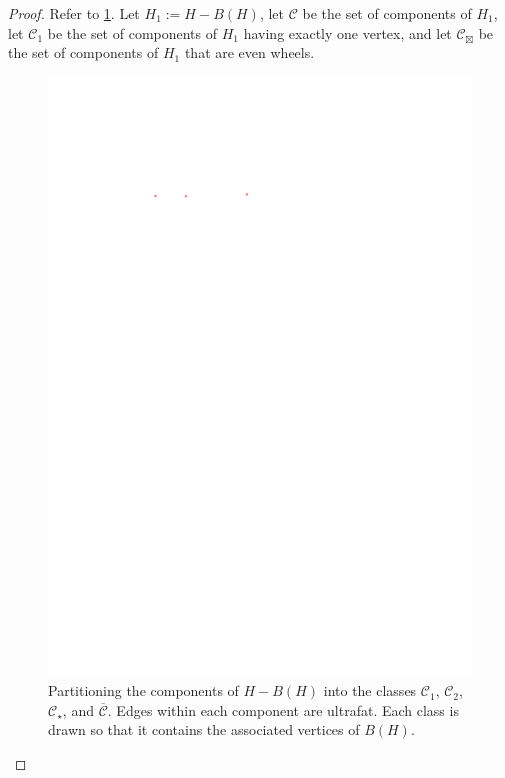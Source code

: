 \documentclass[12pt]{article}
\theoremstyle{definition}
\begin{document}
\begin{proof}
  Refer to \cref{covers}.
  Let $H_1:=H-B(H)$, let $\mathcal{C}$ be the set of components of $H_1$, let $\mathcal{C}_1$ be the set of components of $H_1$ having exactly one vertex,
  and let $\mathcal{C}_{\boxtimes}$ be the set of components of $H_1$ that are even wheels.

  \begin{figure}
    \centering
    \includegraphics[page=5,trim={0 10 0 0},clip]{figs/bg_layers}
    \caption{Partitioning the components of $H-B(H)$ into the classes $\mathcal{C}_1$, $\mathcal{C}_2$, $\mathcal{C}_{\star}$, and $\overline{\mathcal{C}}$.  Edges within each component are ultrafat. Each class is drawn so that it contains the associated vertices of $B(H)$.}
    \label{covers}
  \end{figure}


\end{proof}
\end{document}
